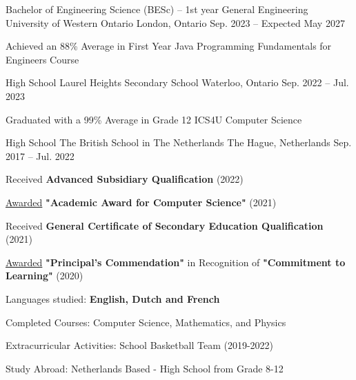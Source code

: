 


\begin{cventries}

  \cventry
    {Bachelor of Engineering Science (BESc) – 1st year General Engineering} %
    {University of Western Ontario} %
    {London, Ontario} %
    {Sep. 2023 -- Expected May 2027} %
    {
      \begin{cvitems}
      \item{Achieved an 88\% Average in First Year Java Programming Fundamentals for Engineers Course}
      \end{cvitems}
    }


  \cventry
    {High School} %
    {Laurel Heights Secondary School} %
    {Waterloo, Ontario} %
    {Sep. 2022 -- Jul. 2023} %
    {
      \begin{cvitems}
      \item{Graduated with a 99\% Average in Grade 12 ICS4U Computer Science}
      \end{cvitems}
    }
  \cventry
    {High School} %
    {The British School in The Netherlands} %
    {The Hague, Netherlands} %
    {Sep. 2017 -- Jul. 2022} %
    {
      \begin{cvitems}
      \item {Received \textbf{Advanced Subsidiary Qualification} (2022)}
      \item {\underline{Awarded} \textbf{"Academic Award for Computer Science"} (2021)}
      \item {Received \textbf{General Certificate of Secondary Education Qualification} (2021)}
      \item {\underline{Awarded} \textbf{"Principal's Commendation"} in Recognition of \textbf{"Commitment to Learning"} (2020)}
      \item{Languages studied: \textbf{English, Dutch and French}}
      \item{Completed Courses: Computer Science, Mathematics, and Physics}
      \item{Extracurricular Activities: School Basketball Team (2019-2022)}
      \item{Study Abroad: Netherlands Based - High School from Grade 8-12}
      \end{cvitems}
    }


\end{cventries}


